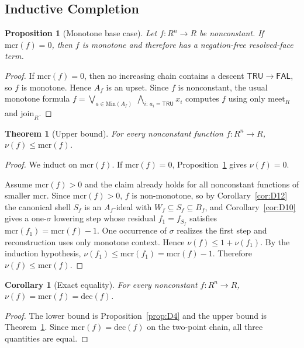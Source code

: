 \documentclass[11pt]{article}
\newtheorem{theorem}{Theorem}
\newtheorem{proposition}{Proposition}
\newtheorem{corollary}{Corollary}
\theoremstyle{remark}
\newcommand{\FAL}{\ensuremath{\mathsf{FAL}}}
\newcommand{\TRU}{\ensuremath{\mathsf{TRU}}}
\newcommand{\meetR}{\ensuremath{\mathrm{meet}_R}}
\newcommand{\joinR}{\ensuremath{\mathrm{join}_R}}
\newcommand{\mcr}{\ensuremath{\mathrm{mcr}}}
\newcommand{\dec}{\ensuremath{\mathrm{dec}}}
\begin{document}
\subsection{Inductive Completion}

\begin{proposition}[Monotone base case]\label{prop:D13}
Let $f:R^n\to R$ be nonconstant. If $\mcr(f)=0$, then $f$ is monotone and
therefore has a negation-free resolved-face term.
\end{proposition}

\begin{proof}
If $\mcr(f)=0$, then no increasing chain contains a descent
$\TRU\to\FAL$, so $f$ is monotone. Hence $A_f$ is an upset. Since $f$ is
nonconstant, the usual monotone formula
$f=\bigvee_{a\in\mathrm{Min}(A_f)}\ \bigwedge_{i:\,a_i=\TRU}x_i$ computes
$f$ using only $\meetR$ and $\joinR$.
\end{proof}

\begin{theorem}[Upper bound]\label{thm:D14}
For every nonconstant function $f:R^n\to R$, $\nu(f)\le\mcr(f)$.
\end{theorem}

\begin{proof}
We induct on $\mcr(f)$. If $\mcr(f)=0$, Proposition~\ref{prop:D13} gives
$\nu(f)=0$.

Assume $\mcr(f)>0$ and the claim already holds for all nonconstant
functions of smaller $\mcr$. Since $\mcr(f)>0$, $f$ is non-monotone, so by
Corollary~\ref{cor:D12} the canonical shell $S_f$ is an $A_f$-ideal with
$W_f\subseteq S_f\subseteq B_f$, and Corollary~\ref{cor:D10} gives a
one-$\sigma$ lowering step whose residual $f_1=f_{S_f}$ satisfies
$\mcr(f_1)=\mcr(f)-1$. One occurrence of $\sigma$ realizes the first step
and reconstruction uses only monotone context. Hence
$\nu(f)\le 1+\nu(f_1)$. By the induction hypothesis,
$\nu(f_1)\le\mcr(f_1)=\mcr(f)-1$. Therefore $\nu(f)\le\mcr(f)$.
\end{proof}

\begin{corollary}[Exact equality]
For every nonconstant $f:R^n\to R$, $\nu(f)=\mcr(f)=\dec(f)$.
\end{corollary}

\begin{proof}
The lower bound is Proposition~\ref{prop:D4} and the upper bound is
Theorem~\ref{thm:D14}. Since $\mcr(f)=\dec(f)$ on the two-point chain, all
three quantities are equal.
\end{proof}
\end{document}
